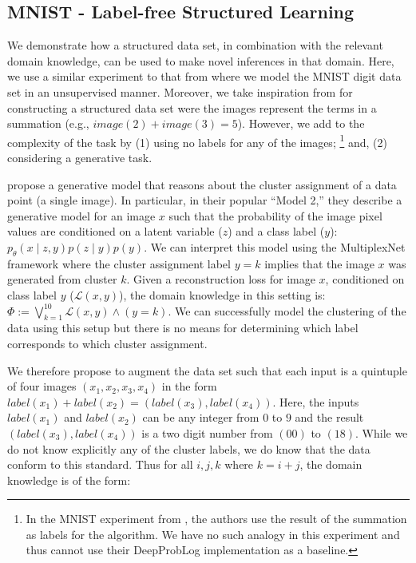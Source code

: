 \documentclass[letterpaper]{article} %
\begin{document}
\subsection{MNIST - Label-free Structured Learning}
\label{sec:mnist_experiment}
We  demonstrate how a structured data set, in combination with the relevant domain knowledge, can be used to make novel inferences in that domain.
Here, we use a similar experiment to that from \citet{kingma2014semi} where we model the MNIST digit data set in an unsupervised manner.
Moreover, we take inspiration from \citet{manhaeve2018deepproblog} for constructing a structured data set were the images represent the terms in a summation (e.g., $image(2) + image(3) = 5$). 
However, we add to the complexity of the task by (1) using no labels for any of the images;%
    \footnote{In the MNIST experiment from \citet{manhaeve2018deepproblog}, the authors use the result of the summation as labels for the algorithm. We have no such analogy in this experiment and thus cannot use their DeepProbLog implementation as a baseline.}
and, (2) considering a generative task.

\citet{kingma2014semi} propose a generative model that reasons about the cluster assignment of a data point (a single image).
In particular, in their popular ``Model 2,'' they describe a generative model for an image $x$ such that the probability of the image pixel values are conditioned on a latent variable ($z$) and a class label ($y$): $p_\theta(x \mid z, y)p(z \mid y)p(y)$.
We can interpret this model using the MultiplexNet framework where the cluster assignment label $y = k$ implies that the image $x$ was generated from cluster $k$.
Given a reconstruction loss for image $x$, conditioned on class label $y$ ($\mathcal{L}(x, y)$), the domain knowledge in this setting is: $\Phi := \bigvee_{k=1}^{10} \mathcal{L}(x, y) \land (y = k)$.
We can successfully model the clustering of the data using this setup but there is no means for determining which label corresponds to which cluster assignment. 

We therefore propose to augment the data set such that each input is a quintuple of four images $(x_1, x_2, x_3, x_4)$ in the form $label(x_1) + label(x_2) = (label(x_3), label(x_4))$.
Here, the inputs $label(x_1)$ and $label(x_2)$ can be any integer from $0$ to $9$ and the result $(label(x_3), label(x_4))$ is a two digit number from $(00)$ to $(18)$.
While we do not know explicitly any of the cluster labels, we do know that the data conform to this standard.
Thus for all $i,j,k$ where $k=i + j$, the domain knowledge is of the form:
\end{document}
